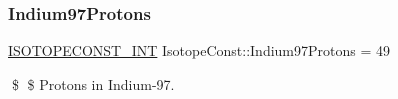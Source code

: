 \subsubsection{\texorpdfstring{Indium97\+Protons}{Indium97Protons}}
{\footnotesize\ttfamily \mbox{\hyperlink{group___isotope_const-_macros_ga5f18360b3e99483a35c32d789e62621c}{I\+S\+O\+T\+O\+P\+E\+C\+O\+N\+S\+T\+\_\+\+I\+NT}} Isotope\+Const\+::\+Indium97\+Protons = 49}

\$ \$ Protons in Indium-\/97. 
